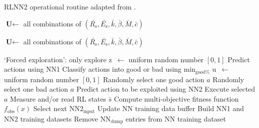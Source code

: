 \documentclass[journal]{IEEEtran}
\let\MYoriglatexcaption\caption
\renewcommand{\caption}[2][\relax]{\MYoriglatexcaption[#2]{#2}}
\begin{document}
\begin{algorithm}
 	\caption{RLNN2 operational routine adapted from \cite{paulo-jrnl}.}
 	\label{RLNN2_algorithm_1}
 	\begin{algorithmic}[1] 		
 		\State $\textbf{U} \gets$ all combinations of $(\bar{R_{\textrm{s}}}, \bar{E_{\textrm{s}}}, \bar{k}, \bar{\beta}, \bar{M}, \bar{c})$
 		

 		\Loop
 			\State $\textbf{U} \gets$ all combinations of $(\bar{R_{\textrm{s}}}, \bar{E_{\textrm{s}}}, \bar{k}, \bar{\beta}, \bar{M}, \bar{c})$
 		\EndIf
 		
 			\State `Forced exploration': only explore
 		\EndWhile 		
 		\State z~$\gets$ uniform random number $[0, 1]$
 		 
			\State Predict actions using NN1
			\State Classify actions into good or bad using $\textrm{min}_{\textrm{good}\%}$
			\State u~$\gets$ uniform random number $[0, 1]$ 
			 
				\State Randomly select one good action $a$
			\Else
 				\State Randomly select one bad action $a$
 			\EndIf
 		\Else {}
 			\State Predict action to be exploited using NN2
 			\State Execute selected $a$
 			\State Measure and/or read RL states $\bar{s}$
 			\State Compute multi-objective fitness function $f_{\textrm{obs}}(x)$
 			\State Select next $\textrm{NN2}_{\textrm{input}}$
 			\State Update NN training data buffer
 			\State Build NN1 and NN2 training datasets
 				\State Remove $\textrm{NN}_{\textrm{dump}}$ entries from NN training dataset
 			\EndIf
 		\EndIf
 		\EndLoop
 	\end{algorithmic}
 \end{algorithm}
\end{document}

